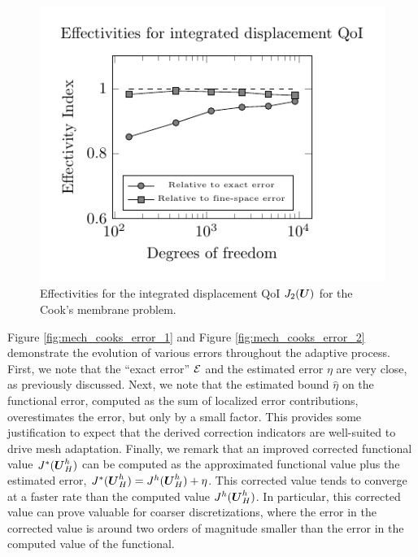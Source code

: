 \begin{figure}[ht!]
\centering
\includegraphics[width=.75\linewidth]{img/mech_cooks_avg_disp_effectivity_plot.pdf}
\caption{Effectivities for the integrated displacement QoI
$J_2(\boldsymbol{U})$ for the Cook's membrane problem.}
\label{fig:mech_cooks_effectivity_2}
\end{figure}

Figure \ref{fig:mech_cooks_error_1} and Figure
\ref{fig:mech_cooks_error_2} demonstrate the evolution of various errors
throughout the adaptive process. First, we note that the ``exact error'' $\mathcal{E}$
and the estimated error $\eta$ are very close, as previously discussed. Next,
we note that the estimated bound $\hat{\eta}$ on the functional error,
computed as the sum of localized error contributions, overestimates the error,
but only by a small factor. This provides some justification to expect that
the derived correction indicators are well-suited to drive mesh adaptation.
Finally, we remark that an improved corrected functional value
$J^*(\boldsymbol{U}^h_H)$ can be computed as the approximated functional value plus
the estimated error, $J^*(\boldsymbol{U}^h_H) = J^h(\boldsymbol{U}^h_H) + \eta$. This
corrected value tends to converge at a faster rate than the computed value
$J^h(\boldsymbol{U}^h_H)$. In particular, this corrected value can prove valuable
for coarser discretizations, where the error in the corrected value is
around two orders of magnitude smaller than the error in the computed
value of the functional.

